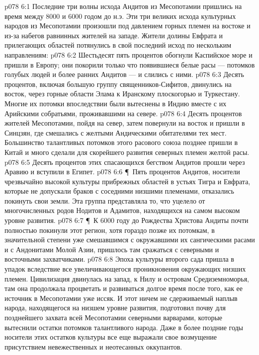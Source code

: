 \vs p078 6:1 Последние три волны исхода Андитов из Месопотамии пришлись на время между 8000 и 6000 годом до н.э. Эти три великих исхода культурных народов из Месопотамии произошли под давлением горных племен на востоке и из\hyp{}за набегов равнинных жителей на западе. Жители долины Евфрата и прилегающих областей потянулись в свой последний исход по нескольким направлениям:
\vs p078 6:2 Шестьдесят пять процентов обогнули Каспийское море и пришли в Европу; они покорили только что появившиеся белые расы --- потомков голубых людей и более ранних Андитов --- и слились с ними.
\vs p078 6:3 Десять процентов, включая большую группу священников\hyp{}Сифитов, двинулись на восток, через горные области Элама к Иранскому плоскогорью и Туркестану. Многие их потомки впоследствии были вытеснены в Индию вместе с их Арийскими собратьями, проживавшими на севере.
\vs p078 6:4 Десять процентов жителей Месопотамии, пойдя на север, затем повернули на восток и пришли в Синцзян, где смешались с желтыми Андическими обитателями тех мест. Большинство талантливых потомков этого расового союза позднее пришли в Китай и много сделали для скорейшего развития северных племен желтой расы.
\vs p078 6:5 Десять процентов этих спасающихся бегством Андитов прошли через Аравию и вступили в Египет.
\vs p078 6:6 \P\ Пять процентов Андитов, носители чрезвычайно высокой культуры прибрежных областей в устьях Тигра и Евфрата, которые не допускали браков с соседними низшими племенами, отказались покинуть свои земли. Эта группа представляла то, что уцелело от многочисленных родов Нодитов и Адамитов, находящихся на самом высоком уровне развития.
\vs p078 6:7 \P\ К 6000 году до Рождества Христова Андиты почти полностью покинули этот регион, хотя гораздо позже их потомкам, в значительной степени уже смешавшимся с окружавшими их сангическими расами и с Андонитами Молой Азии, пришлось там сражаться с северными и восточными захватчиками.
\vs p078 6:8 Эпоха культуры второго сада пришла в упадок вследствие все увеличивающегося проникновения окружающих низших племен. Цивилизация двинулась на запад, к Нилу и островам Средиземноморья, там она продолжала процветать и развиваться долгое время после того, как ее источник в Месопотамии уже иссяк. И этот ничем не сдерживаемый наплыв народа, находящегося на низшем уровне развития, подготовил почву для позднейшего захвата всей Месопотамии северными варварами, которые вытеснили остатки потомков талантливого народа. Даже в более поздние годы носители этих остатков культуры все еще выражали свое возмущение присутствием невежественных и неотесанных оккупантов.
